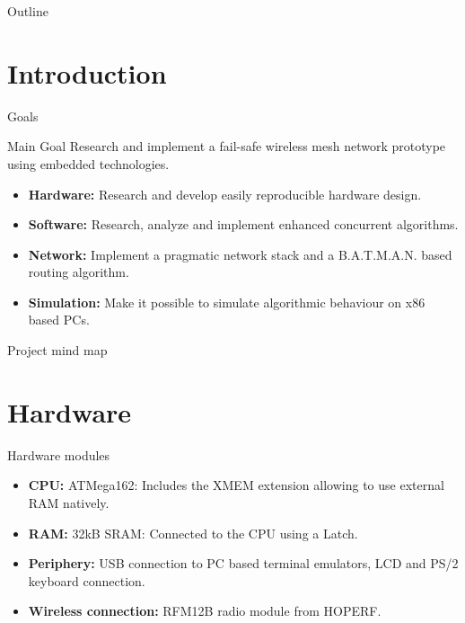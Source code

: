 \begin{frame}
\titlepage
\end{frame}

\begin{frame}{Outline}
\tableofcontents
\end{frame}

\section{Introduction}
\begin{frame}{Goals}

\begin{exampleblock}{Main Goal}
Research and implement a fail-safe wireless mesh network prototype using embedded technologies.
\end{exampleblock}

\begin{itemize}
    \item \textbf{Hardware:} Research and develop easily reproducible hardware design.
    \item \textbf{Software:} Research, analyze and implement enhanced concurrent algorithms.
    \item \textbf{Network:} Implement a pragmatic network stack and a B.A.T.M.A.N. based routing algorithm.
    \item \textbf{Simulation:} Make it possible to simulate algorithmic behaviour on x86 based PCs.
\end{itemize} 
\end{frame}

\begin{frame}{Project mind map}
\begin{center}
\scalebox{0.56} {
}
\end{center}
\end{frame}

\section{Hardware}
\begin{frame}{Hardware modules}
\begin{itemize}
    \item \textbf{CPU:} ATMega162: Includes the XMEM extension allowing to use external RAM natively.
    \item \textbf{RAM:} 32kB SRAM: Connected to the CPU using a Latch.
    \item \textbf{Periphery:} USB connection to PC based terminal emulators, LCD and PS/2 keyboard connection.
    \item \textbf{Wireless connection:} RFM12B radio module from HOPERF.
\end{itemize} 
\end{frame}

